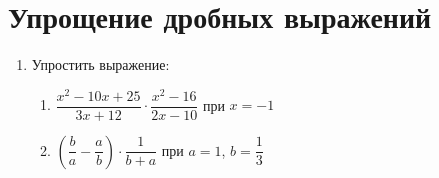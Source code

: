 \documentclass[12pt, a4paper]{article}
\begin{document}
		

\section{Упрощение дробных выражений}
\begin{enumerate}
	\item Упростить выражение:
	\begin{multicols}{2}
		\begin{enumerate}[label=\asbuk*)]
			\item $\dfrac{x^2-10x+25}{3x+12}\cdot\dfrac{x^2-16}{2x-10}$ при $x=-1$
			\item $\left(\dfrac{b}{a}-\dfrac{a}{b}\right)\cdot\dfrac{1}{b+a}$ при $a=1$, $b=\dfrac{1}{3}$
		\end{enumerate}
	\end{multicols}
\end{enumerate}
\end{document}
